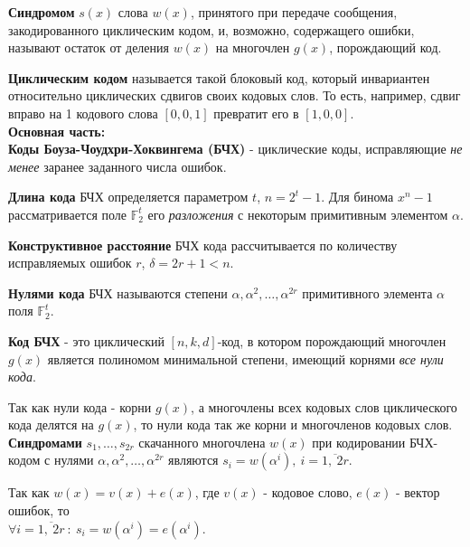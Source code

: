 \textbf{Синдромом} $s(x)$ слова $w(x)$, принятого при передаче сообщения,
закодированного циклическим кодом, и, возможно, содержащего ошибки, называют остаток
от деления $w(x)$ на многочлен $g(x)$, порождающий код.


\textbf{Циклическим кодом} называется такой блоковый код, который инвариантен
относительно циклических сдвигов своих кодовых слов. То есть, например, сдвиг
вправо на 1 кодового слова $[0, 0, 1]$ превратит его в $[1, 0, 0]$.\\



\textbf{Основная часть:}\\
\textbf{Коды Боуза-Чоудхри-Хоквингема (БЧХ)} - циклические коды, исправляющие
\textit{не менее} заранее заданного числа ошибок.

\textbf{Длина кода} БЧХ определяется параметром $t$, $n = 2^t - 1$. Для бинома
$x^n - 1$ рассматривается поле $\mathbb{F}_2^t$ его \textit{разложения} с некоторым
примитивным элементом $\alpha$.

\textbf{Конструктивное расстояние} БЧХ кода рассчитывается по количеству
исправляемых ошибок $r$, $\delta = 2r + 1 < n$.

\textbf{Нулями кода} БЧХ называются степени
$\alpha, \alpha^2, \ldots, \alpha^{2r}$ примитивного элемента $\alpha$ поля
$\mathbb{F}_2^t$.

\textbf{Код БЧХ} - это циклический $[n,k,d]$-код, в котором порождающий многочлен
$g(x)$ является полиномом минимальной степени, имеющий корнями \textit{все нули
кода}.

Так как нули кода - корни $g(x)$, а многочлены всех кодовых слов циклического кода
делятся на $g(x)$, то нули кода так же корни и многочленов кодовых слов.\\

\textbf{Синдромами} $s_1, \ldots, s_{2r}$ скачанного многочлена $w(x)$ при
кодировании БЧХ-кодом с нулями $\alpha, \alpha^2, \ldots, \alpha^{2r}$ являются
$s_i = w(\alpha^i),~i = \overline{1,~2r}$.

Так как $w(x) = v(x) + e(x)$, где $v(x)$ - кодовое слово, $e(x)$ - вектор
ошибок, то\\
$\forall i = \overline{1,~2r} ~:~ s_i = w(\alpha^i) = e(\alpha^i)$.

